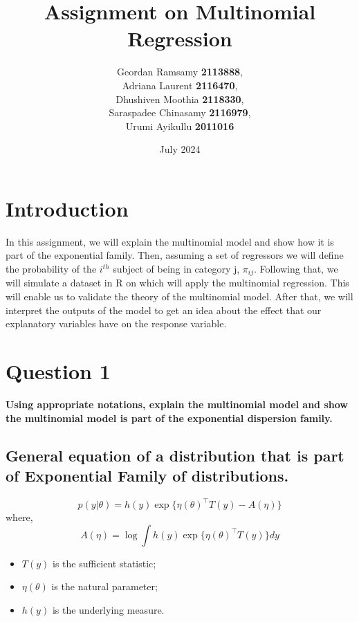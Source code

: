 \documentclass[12pt]{article}
\date{July 2024}
\title{\huge Assignment on Multinomial Regression}
\author{\Large Geordan Ramsamy \textbf{2113888}, \\
         Adriana Laurent \textbf{2116470}, \\
         Dhushiven Moothia \textbf{2118330}, \\
         Saraspadee Chinasamy \textbf{2116979}, \\
         Urumi Ayikullu \textbf{2011016}}
\affil{BSc (Hons) Business statistics with finance \\ Year 3}
\affil{University of Mauritius}
\begin{document}
\maketitle
\clearpage
\tableofcontents

\clearpage

\section*{Introduction}

In this assignment, we will explain the multinomial model and show how it is part of the exponential family. Then, assuming a set of regressors we will define the probability of the $i^{th}$ subject of being in category j, $\pi_{ij}$. Following that, we will simulate a dataset in R on which will apply the multinomial regression. This will enable us to validate the theory of the multinomial model. After that, we will interpret the outputs of the model to get an idea about the effect that our explanatory variables have on the response variable.

\section{Question 1}
\textbf{Using appropriate notations, explain the multinomial model and show the multinomial model is part of the exponential dispersion family.}

\subsection{General equation of a distribution that is part of Exponential Family of distributions.}
\begin{equation}
  p(y|\theta) = h(y)\exp \{ \eta(\theta)^\intercal T(y) - A(\eta) \}
\end{equation}
where, 
\begin{equation*}
  A(\eta) = \log \int h(y) \exp \{ \eta(\theta)^\intercal T(y) \} dy
\end{equation*}

\begin{itemize}
    \item $T(y)$ is the sufficient statistic;
    \item $\eta(\theta)$ is the natural parameter;
    \item $h(y)$ is the underlying measure.
\end{itemize}
\end{document}

